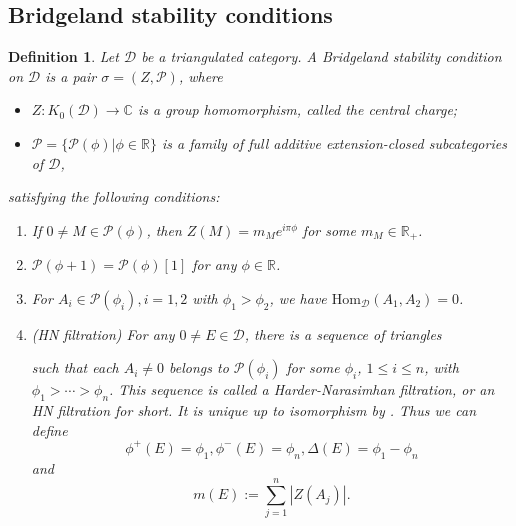 \documentclass[a4paper,12pt]{amsart}
\numberwithin{equation}{section}
\newtheorem{definition}[theorem]{Definition}
\newcommand{\Hom}{\mathrm{Hom}}
\newcommand{\1}{\mathbf{1}}
\begin{document}
\subsection{Bridgeland stability conditions}
\begin{definition}
    Let $\mathcal{D}$ be a triangulated category. A \emph{Bridgeland stability condition} on $\mathcal{D}$ is a pair $\sigma=(Z,\mathcal{P})$, where
    \begin{itemize}
        \item $Z:K_0(\mathcal{D})\rightarrow\mathbb{C}$ is a group homomorphism, called the \emph{central charge};
        \item $\mathcal{P}=\{\mathcal{P}(\phi)|\phi\in\mathbb{R}\}$ is a family of full additive extension-closed subcategories of $\mathcal{D}$,
    \end{itemize}
    satisfying the following conditions:
    \begin{enumerate}
        \item If $0\neq M\in\mathcal{P}(\phi)$, then $Z(M)=m_Me^{i\pi\phi}$ for some $m_M\in\mathbb{R}_+$.
        \item $\mathcal{P}(\phi+1)=\mathcal{P}(\phi)[1]$ for any $\phi\in\mathbb{R}$.
        \item For $A_i\in\mathcal{P}(\phi_i),i=1,2$ with $\phi_1>\phi_2$, we have $\Hom_\mathcal{D}(A_1,A_2)=0$.
        \item (HN filtration) For any $0\neq E\in\mathcal{D}$, there is a sequence of triangles
        \begin{center}
        \end{center}
        such that each $A_i\neq0$ belongs to $\mathcal{P}(\phi_i)$ for some $\phi_i$, $1\leqslant i\leqslant n$, with $\phi_1>\cdots>\phi_n$. This sequence is called a \emph{Harder-Narasimhan filtration}, or an \emph{HN filtration} for short. It is unique up to isomorphism by \cite{Bri2007}. Thus we can define
        \[\phi^+(E)=\phi_1,\phi^-(E)=\phi_n,\Delta(E)=\phi_1-\phi_n\]
        and
        \[m(E):=\sum_{j=1}^n|Z(A_j)|.\]
    \end{enumerate}
\end{definition}
\end{document}
